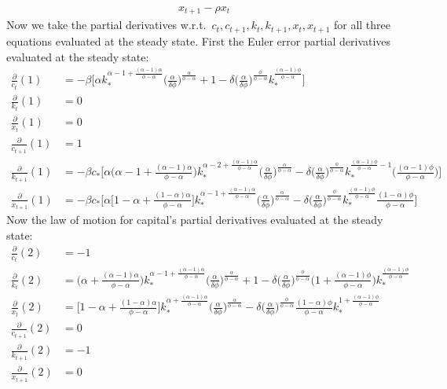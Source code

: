 \documentclass[a4paper]{article}
\theoremstyle{definition}
\begin{document}
	\begin{align}
	x_{t+1} - \rho x_{t}
	\end{align}
\normalsize	
Now we take the partial derivatives w.r.t.\ $c_{t},c_{t+1},k_{t},k_{t+1},x_{t},x_{t+1}$ for all three equations evaluated at the steady state. First the Euler error partial derivatives evaluated at the steady state:
	\begin{align*}
	\frac{\partial}{c_{t}}(1) 		&= -\beta\bigg[\alpha  k_{*}^{\alpha-1+\frac{(\alpha-1)\alpha}{\phi-\alpha}}\Big( \frac{\alpha}{\delta\phi}\Big)^{\frac{\alpha}{\phi-\alpha}}+1-\delta \Big( \frac{\alpha}{\delta\phi}\Big)^{\frac{\phi}{\phi-\alpha}}k_{*}^{\frac{(\alpha-1)\phi}{\phi-\alpha}} \bigg] \\
	\frac{\partial}{k_{t}}(1) 		&= 0\\
	\frac{\partial}{x_{t}}(1) 		&= 0\\
	\frac{\partial}{c_{t+1}}(1) 	&= 1\\			
	\frac{\partial}{k_{t+1}}(1) 	&= -\beta c_{*} \bigg[\alpha \Big( \alpha-1+\frac{(\alpha-1)\alpha}{\phi-\alpha} \Big) k_{*}^{\alpha-2+\frac{(\alpha-1)\alpha}{\phi-\alpha}}\Big( \frac{\alpha}{\delta\phi}\Big)^{\frac{\alpha}{\phi-\alpha}}-\delta \Big( \frac{\alpha}{\delta\phi}\Big)^{\frac{\phi}{\phi-\alpha}}k_{*}^{\frac{(\alpha-1)\phi}{\phi-\alpha}-1}\Big( \frac{(\alpha-1)\phi}{\phi-\alpha}\Big) \bigg]\\
	\frac{\partial}{x_{t+1}}(1) 	&= -\beta c_{*}\bigg[\alpha \big[1-\alpha+\frac{(1-\alpha)\alpha}{\phi-\alpha} \big] k_{*}^{\alpha-1+\frac{(\alpha-1)\alpha}{\phi-\alpha}}\Big( \frac{\alpha}{\delta\phi}\Big)^{\frac{\alpha}{\phi-\alpha}}-\delta \Big( \frac{\alpha}{\delta\phi}\Big)^{\frac{\phi}{\phi-\alpha}}k_{*}^{\frac{(\alpha-1)\phi}{\phi-\alpha}}\frac{(1-\alpha)\phi}{\phi-\alpha} \bigg]
	\end{align*}
Now the law of motion for capital's partial derivatives evaluated at the steady state:
	\begin{align*}
	\frac{\partial}{c_{t}}(2) 		&= -1\\
	\frac{\partial}{k_{t}}(2) 		&= \Big( \alpha+\frac{(\alpha-1)\alpha}{\phi-\alpha} \Big)k_{*}^{\alpha-1+\frac{(\alpha-1)\alpha}{\phi-\alpha}} \Big( \frac{\alpha}{\delta\phi}\Big)^{\frac{\alpha}{\phi-\alpha}}+1-\delta \Big( \frac{\alpha}{\delta\phi}\Big)^{\frac{\phi}{\phi-\alpha}} \Big( 1+\frac{(\alpha-1)\phi}{\phi-\alpha} \Big) k_{*}^{\frac{(\alpha-1)\phi}{\phi-\alpha}} \\
	\frac{\partial}{x_{t}}(2) 		&= \Big[ 1-\alpha+\frac{(1-\alpha)\alpha}{\phi-\alpha} \Big]k_{*}^{\alpha+\frac{(\alpha-1)\alpha}{\phi-\alpha}} \Big( \frac{\alpha}{\delta\phi}\Big)^{\frac{\alpha}{\phi-\alpha}}-\delta \Big( \frac{\alpha}{\delta\phi}\Big)^{\frac{\phi}{\phi-\alpha}}\frac{(1-\alpha)\phi}{\phi-\alpha}k_{*}^{1+\frac{(\alpha-1)\phi}{\phi-\alpha}} \\
	\frac{\partial}{c_{t+1}}(2) 	&= 0\\			
	\frac{\partial}{k_{t+1}}(2) 	&= -1\\
	\frac{\partial}{x_{t+1}}(2) 	&= 0
	\end{align*}	
\end{document}
